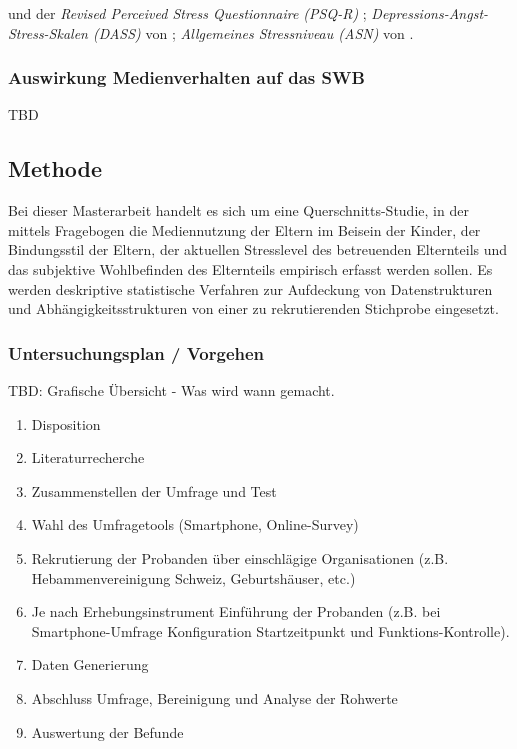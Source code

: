 und der \textit{Revised Perceived Stress Questionnaire (PSQ-R)} \cite{Levenstein1993, Fliege2005, Cohen1983}; \textit{Depressions-Angst-Stress-Skalen (DASS)} von \cite{Nilges2015}; \textit{Allgemeines Stressniveau (ASN)} von .
 
\subsubsection{Auswirkung Medienverhalten auf das SWB}
TBD

\subsection{Methode}
Bei dieser Masterarbeit handelt es sich um eine Querschnitts-Studie, in der mittels Fragebogen die Mediennutzung der Eltern im Beisein der Kinder, der Bindungsstil der Eltern, der aktuellen Stresslevel des betreuenden Elternteils und das subjektive Wohlbefinden des Elternteils empirisch erfasst werden sollen. 
Es werden deskriptive statistische Verfahren zur Aufdeckung von Datenstrukturen und Abhängigkeitsstrukturen von einer zu rekrutierenden Stichprobe eingesetzt.
\subsubsection{Untersuchungsplan / Vorgehen}
TBD: Grafische Übersicht - Was wird wann gemacht.
\begin{enumerate}
    \item Disposition
    \item Literaturrecherche
    \item Zusammenstellen der Umfrage und Test
    \item Wahl des Umfragetools (Smartphone, Online-Survey)
    \item Rekrutierung der Probanden über einschlägige Organisationen (z.B. Hebammenvereinigung Schweiz, Geburtshäuser, etc.)
    \item Je nach Erhebungsinstrument Einführung der Probanden (z.B. bei Smartphone-Umfrage Konfiguration Startzeitpunkt und Funktions-Kontrolle).
    \item Daten Generierung
    \item Abschluss Umfrage, Bereinigung und Analyse der Rohwerte
    \item Auswertung der Befunde
\end{enumerate}
